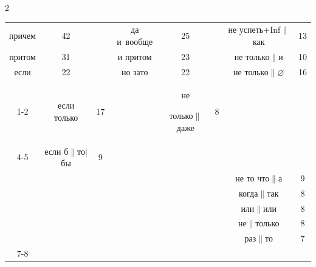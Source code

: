 \begin{multicols}{2}
\begin{table}
\begin{center}
\begin{tabular}{|c|c|c|c|c|c|c|c|}


причем&42&&да и~вообще&25&&не успеть\;+\;Inf$\|$как&13\\




притом&31&&и притом&23&&не только$\|$и&10\\




если&22&&но зато&22&&не только$\|$$\varnothing$&16\\


\cline{1-2}


\multicolumn{3}{c|}{\ }&если только&17&&не 


только$\|$даже&\hphantom{9}8\\


\cline{4-5}


\multicolumn{6}{c|}{\ }&если б$\|$то$\vert$бы&\hphantom{9}9\\




\multicolumn{6}{c|}{\ }&не то что$\|$а&\hphantom{9}9\\




\multicolumn{6}{c|}{\ }&когда$\|$так&\hphantom{9}8\\




\multicolumn{6}{c|}{\ }&или$\|$или&\hphantom{9}8\\




\multicolumn{6}{c|}{\ }&не$\|$только&\hphantom{9}8\\




\multicolumn{6}{c|}{\ }&раз$\|$то&\hphantom{9}7\\


\cline{7-8}


\end{tabular}


\end{center}


\vspace*{-9pt}


\end{table}





\vspace*{-9pt}






\end{multicols}
